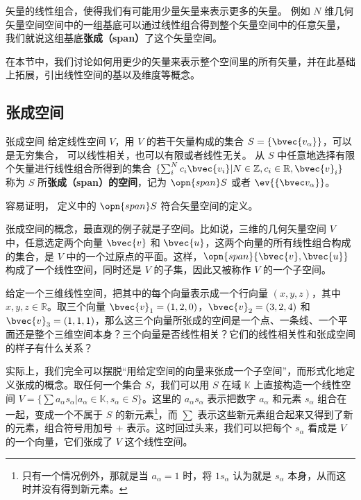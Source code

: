 


矢量的线性组合，使得我们有可能用少量矢量来表示更多的矢量。 例如 $N$ 维几何矢量空间空间中的一组基底可以通过线性组合得到整个矢量空间中的任意矢量， 我们就说这组基底\textbf{张成（span）}了这个矢量空间。 

在本节中，我们讨论如何用更少的矢量来表示整个空间里的所有矢量，并在此基础上拓展，引出线性空间的基以及维度等概念。

\subsection{张成空间}

\begin{definition}{张成空间}\label{def_VecSpn_1}
给定线性空间 $V$，用 $V$ 的若干矢量构成的集合 $S=\{\bvec{v_\alpha}\}$，可以是无穷集合， 可以线性相关，也可以有限或者线性无关。 从 $S$ 中任意地选择有限个矢量进行线性组合所得到的集合 $\{\sum_i^N c_i\bvec{v_i}|N\in\mathbb{Z}, c_i\in\mathbb{R}, \bvec{v}_i\}$ 称为 $S$ 所\textbf{张成（span）的空间}，记为 $\opn{span} S$ 或者 $\ev{\{\bvec v_\alpha\}}$。
\end{definition}
容易证明， 定义中的 $\opn{span} S$ 符合矢量空间的定义。

张成空间的概念，最直观的例子就是子空间。比如说，三维的几何矢量空间 $V$ 中，任意选定两个向量 $\bvec{v}$ 和 $\bvec{u}$，这两个向量的所有线性组合构成的集合，是 $V$ 中的一个过原点的平面。这样，$\opn{span}\{\bvec{v}, \bvec{u}\}$ 构成了一个线性空间，同时还是 $V$ 的子集，因此又被称作 $V$ 的一个子空间。

\begin{exercise}{}\label{exe_VecSpn_1}
给定一个三维线性空间，把其中的每个向量表示成一个行向量 $(x,y,z)$，其中 $x,y,z\in\mathbb{R}$。取三个向量 $\bvec{v}_1=(1,2,0)$，$\bvec{v}_2=(3,2,4)$ 和 $\bvec{v}_3=(1,1,1)$，那么这三个向量所张成的空间是一个点、一条线、一个平面还是整个三维空间本身？三个向量是否线性相关？它们的线性相关性和张成空间的样子有什么关系？
\end{exercise}

实际上，我们完全可以摆脱“用给定空间的向量来张成一个子空间”，而形式化地定义张成的概念。取任何一个集合 $S$，我们可以用 $S$ 在域 $\mathbb{K}$ 上直接构造一个线性空间 $V=\{\sum a_\alpha s_\alpha|a_\alpha\in\mathbb{K}, s_\alpha\in S\}$。这里的 $a_\alpha s_\alpha$ 表示把数字 $a_\alpha$ 和元素 $s_\alpha$ 组合在一起，变成一个不属于 $S$ 的新元素\footnote{只有一个情况例外，那就是当 $a_\alpha=1$ 时，将 $1s_\alpha$ 认为就是 $s_\alpha$ 本身，从而这时并没有得到新元素。}，而 $\sum$ 表示这些新元素组合起来又得到了新的元素，组合符号用加号 $+$ 表示。这时回过头来，我们可以把每个 $s_\alpha$ 看成是 $V$ 的一个向量，它们张成了 $V$ 这个线性空间。

